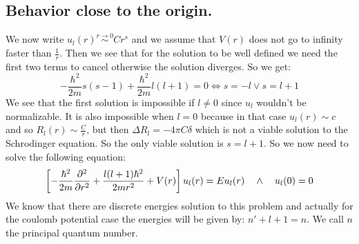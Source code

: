 \documentclass[10pt,a4paper]{book}
\begin{document}
\subsection{Behavior close to the origin.}
We now write $u_l(r) \stackrel{r\to0}{\sim} C r^s$ and we assume that $V(r)$ does not go to infinity faster than $\frac{1}{r}$. Then we see that for the solution to be well defined we need the first two terms to cancel otherwise the solution diverges. So we get:
\[
-\frac{\hbar^2}{2m} s(s-1) + \frac{\hbar^2}{2m} l (l+1) = 0 \Leftrightarrow s = - l \lor s = l+ 1
\]
We see that the first solution is impossible if $l \neq 0$ since $u_l$ wouldn't be normalizable. It is also impossible when $l = 0$ because in that case $u_l(r) \sim c$ and so $R_l(r) \sim \frac{C}{r}$, but then $\Delta R_l = -4 \pi C \delta$ which is not a viable solution to the Schrodinger equation. So the only viable solution is $s = l+1$. So we now need to solve the following equation:
\[
\left[ - \frac{\hbar^2}{2m} \pdv[2]{}{r} + \frac{l(l+1) \hbar^2}{2m r^2} + V(r)\right] u_l(r) = E u_l(r) \quad \land \quad u_l(0) = 0
\]
We know that there are discrete energies solution to this problem and actually for the coulomb potential case the energies will be given by: $n' + l + 1 = n$. We call $n$ the principal quantum number.
\end{document}
